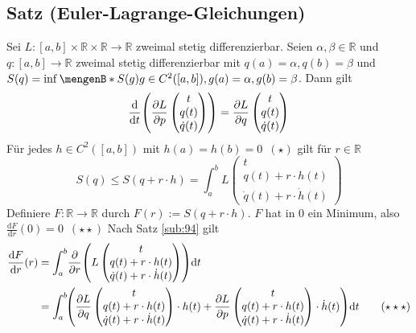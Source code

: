 \subsection{Satz (Euler-Lagrange-Gleichungen)} %
\label{sub:102}
Sei $L : [a,b] \times \mathds{R} \times \mathds{R} \to \mathds{R}$ zweimal stetig differenzierbar. Seien $\alpha, \beta \in \mathds{R}$ und $q : [a,b] \to \mathds{R}$
zweimal stetig differenzierbar mit $q(a)=\alpha, q(b)=\beta$ und $S(q) = \inf \set[S(g)]{g \in C^2([a,b]) , g(a)=\alpha, g(b)=\beta} $. Dann gilt 
\[
	  \frac{\mathrm{d}}{\mathrm{d} t} \enbrace*{\diff{L}{p} \begin{pmatrix}
		t \\ q(t) \\ \dot q(t)
	\end{pmatrix}} = \diff{L}{q}  \begin{pmatrix}
		t \\ q(t) \\ \dot q(t)
	\end{pmatrix}
\]
Für jedes $h \in C^2([a,b])$ mit $h(a)=h(b)=0 \enspace(\star)$ gilt für $r \in \mathds{R}$
\[
	S(q) \le S(q + r \cdot h) = \int_{a} ^{b} \! L \begin{pmatrix}
		t \\ q(t) + r \cdot h(t) \\ \dot q(t) + r \cdot \dot h(t)
	\end{pmatrix}
\]
Definiere $F : \mathds{R} \to \mathds{R}$ durch $F(r) := S(q + r \cdot h)$. $F$ hat in $0$ ein Minimum, also $\frac{\mathrm{d}F}{\mathrm{d} r}(0)=0  \enspace(\star \star)$
Nach Satz \ref{sub:94} gilt 
\begin{align*}
	\frac{\mathrm{d} F}{\mathrm{d} r} (r) &= \int_{a} ^{b} \!  \diff{}{r} \enbrace*{L \begin{pmatrix}
		t \\ q(t) + r \cdot h(t) \\ \dot q(t) + r \cdot \dot h(t)
	\end{pmatrix}} \mathrm{d}t \\ &= \int_{a} ^{b} \! \enbrace*{\diff{L}{q}  \begin{pmatrix}
		t \\ q(t) + r \cdot h(t) \\ \dot q(t) + r \cdot \dot h(t)
	\end{pmatrix} \cdot h(t) + \diff{L}{p} \begin{pmatrix}
		t \\ q(t) + r \cdot h(t) \\ \dot q(t) + r \cdot \dot h(t)
	\end{pmatrix} \cdot  \dot h (t) }  \mathrm{d}t \tag{$\star\star\star$}
\end{align*}
